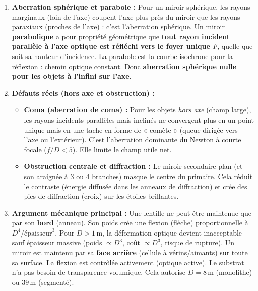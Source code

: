 \documentclass[11pt]{article}
\begin{document}
\begin{corrige}
\begin{enumerate}
    \item \textbf{Aberration sphérique et parabole :} Pour un miroir sphérique, les rayons marginaux (loin de l'axe) coupent l'axe plus près du miroir que les rayons paraxiaux (proches de l'axe) : c'est l'aberration sphérique. Un miroir \textbf{parabolique} a pour propriété géométrique que \textbf{tout rayon incident parallèle à l'axe optique est réfléchi vers le foyer unique $F$}, quelle que soit sa hauteur d'incidence. La parabole est la courbe isochrone pour la réflexion : chemin optique constant. Donc \textbf{aberration sphérique nulle pour les objets à l'infini sur l'axe}.
    \item \textbf{Défauts réels (hors axe et obstruction) :}
        \begin{itemize}
            \item \textbf{Coma (aberration de coma) :} Pour les objets \emph{hors axe} (champ large), les rayons incidents parallèles mais inclinés ne convergent plus en un point unique mais en une tache en forme de « comète » (queue dirigée vers l'axe ou l'extérieur). C'est l'aberration dominante du Newton à courte focale ($f/D < 5$). Elle limite le champ utile net.
            \item \textbf{Obstruction centrale et diffraction :} Le miroir secondaire plan (et son araignée à 3 ou 4 branches) masque le centre du primaire. Cela réduit le contraste (énergie diffusée dans les anneaux de diffraction) et crée des pics de diffraction (croix) sur les étoiles brillantes.
        \end{itemize}
    \item \textbf{Argument mécanique principal :} Une lentille ne peut être maintenue que par son \textbf{bord} (anneau). Son poids crée une flexion (flèche) proportionnelle à $D^4 / \text{épaisseur}^3$. Pour $D > 1\,\text{m}$, la déformation optique devient inacceptable sauf épaisseur massive (poids $\propto D^3$, coût $\propto D^3$, risque de rupture). Un miroir est maintenu par sa \textbf{face arrière} (cellule à vérins/aimants) sur toute sa surface. La flexion est contrôlée activement (optique active). Le substrat n'a pas besoin de transparence volumique. Cela autorise $D = 8\,\text{m}$ (monolithe) ou $39\,\text{m}$ (segmenté).
\end{enumerate}
\end{corrige}

\newpage
\end{document}
